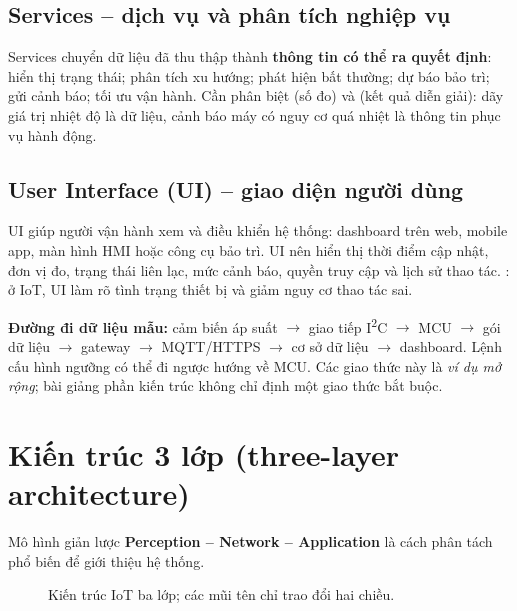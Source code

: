 \subsection{Services -- dịch vụ và phân tích nghiệp vụ}
Services chuyển dữ liệu đã thu thập thành \textbf{thông tin có thể ra quyết định}: hiển thị trạng thái; phân tích xu hướng; phát hiện bất thường; dự báo bảo trì; gửi cảnh báo; tối ưu vận hành. Cần phân biệt  (số đo) và  (kết quả diễn giải): dãy giá trị nhiệt độ là dữ liệu, cảnh báo máy có nguy cơ quá nhiệt là thông tin phục vụ hành động.

\subsection{User Interface (UI) -- giao diện người dùng}
UI giúp người vận hành xem và điều khiển hệ thống: dashboard trên web, mobile app, màn hình HMI hoặc công cụ bảo trì. UI nên hiển thị thời điểm cập nhật, đơn vị đo, trạng thái liên lạc, mức cảnh báo, quyền truy cập và lịch sử thao tác. : ở IoT, UI làm rõ tình trạng thiết bị và giảm nguy cơ thao tác sai.

\begin{expandbox}
\textbf{Đường đi dữ liệu mẫu:} cảm biến áp suất $\rightarrow$ giao tiếp I\textsuperscript{2}C $\rightarrow$ MCU $\rightarrow$ gói dữ liệu $\rightarrow$ gateway $\rightarrow$ MQTT/HTTPS $\rightarrow$ cơ sở dữ liệu $\rightarrow$ dashboard. Lệnh cấu hình ngưỡng có thể đi ngược hướng về MCU. Các giao thức này là \textit{ví dụ mở rộng}; bài giảng phần kiến trúc không chỉ định một giao thức bắt buộc.
\end{expandbox}

\section{Kiến trúc 3 lớp (three-layer architecture)}
Mô hình giản lược \textbf{Perception -- Network -- Application} là cách phân tách phổ biến để giới thiệu hệ thống.
\begin{figure}[H]\centering
{}\caption{Kiến trúc IoT ba lớp; các mũi tên chỉ trao đổi hai chiều.}
\end{figure}


